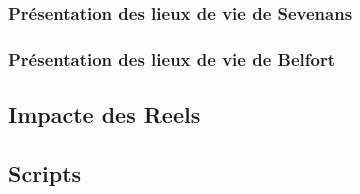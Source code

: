 \subsubsection{Présentation des lieux de vie de Sevenans}

\subsubsection{Présentation des lieux de vie de Belfort}

\subsection{Impacte des Reels}\label{subsec:impacte-des-reels}

\subsection{Scripts}\label{subsec:scripts}

\begin{dialogue}
     \lipsum[1]
     \lipsum[2]
\end{dialogue}